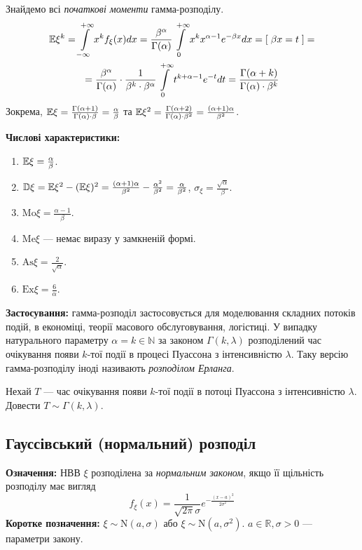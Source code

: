 Знайдемо всі \emph{початкові моменти} гамма-розподілу.
\begin{gather*}
    \mathbb{E}\xi^k = \int\limits_{-\infty}^{+\infty} x^k f_\xi(x)dx =
    \frac{\beta^\alpha}{\Gamma(\alpha)} \int\limits_0^{+\infty} x^k x^{\alpha-1} e^{-\beta x} dx =
    \left[\; \beta x = t \;\right] = \\
    = \frac{\beta^\alpha}{\Gamma(\alpha)} \cdot \frac{1}{\beta^k\cdot \beta^{\alpha}} \int\limits_0^{+\infty} t^{k+\alpha-1} e^{-t} dt =
    \frac{\Gamma(\alpha+k)}{\Gamma(\alpha) \cdot \beta^k}
\end{gather*}
Зокрема, $\mathbb{E}\xi = \frac{\Gamma(\alpha+1)}{\Gamma(\alpha) \cdot \beta} = \frac{\alpha}{\beta}$ та 
$\mathbb{E}\xi^2 = \frac{\Gamma(\alpha+2)}{\Gamma(\alpha) \cdot \beta^2}  = \frac{(\alpha+1)\alpha}{\beta^2}$.

\noindent\textbf{Числові характеристики:}
\begin{enumerate}
    \item $\mathbb{E}\xi = \frac{\alpha}{\beta}$.
    \item $\mathbb{D}\xi = \mathbb{E}\xi^2 - (\mathbb{E}\xi)^2 = \frac{(\alpha+1)\alpha}{\beta^2} - \frac{\alpha^2}{\beta^2} = \frac{\alpha}{\beta^2}$, $\sigma_\xi = \frac{\sqrt{\alpha}}{\beta}$.
    \item $\mathrm{Mo}\xi = \frac{\alpha-1}{\beta}$.
    \item $\mathrm{Me}\xi$ --- немає виразу у замкненій формі.
    \item $\mathrm{As}\xi = \frac{2}{\sqrt{\alpha}}$.
    \item $\mathrm{Ex}\xi = \frac{6}{\alpha}$.
\end{enumerate}

\noindent\textbf{Застосування:} гамма-розподіл застосовується для моделювання
складних потоків подій, в економіці, теорії масового обслуговування, логістиці.
У випадку натурального параметру $\alpha = k \in \mathbb{N}$ за законом
$\Gamma(k, \lambda)$ розподілений час очікування появи $k$-тої події
в процесі Пуассона з інтенсивністю $\lambda$. Таку версію гамма-розподілу іноді називають \emph{розподілом Ерланга}.
\begin{exercise}
    Нехай $T$ --- час очікування появи $k$-тої події
    в потоці Пуассона з інтенсивністю $\lambda$. Довести $T \sim \Gamma(k, \lambda)$.
\end{exercise} %

\subsection{Гауссівський (нормальний) розподіл}
\noindent\textbf{Означення:}
    НВВ $\xi$ розподілена за \emph{нормальним законом}, 
    якщо її щільність розподілу має вигляд 
    \begin{equation}
        f_\xi(x) = \frac{1}{\sqrt{2\pi}\sigma} e^{-\frac{(x-a)^2}{2\sigma^2}}
    \end{equation}
\textbf{Коротке позначення:} $\xi \sim \mathrm{N}(a, \sigma)$ або 
    $\xi \sim \mathrm{N}(a, \sigma^2)$.
    $a \in \mathbb{R}, \sigma > 0$ --- параметри закону.

